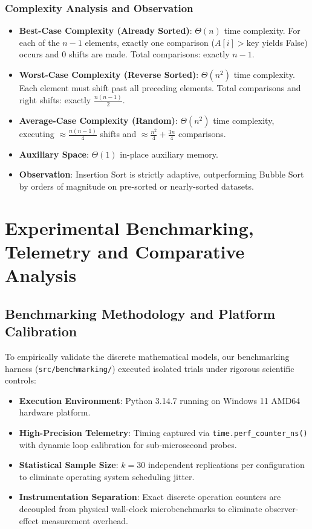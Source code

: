 \documentclass[11pt,a4paper,oneside]{report}
\theoremstyle{definition}
\begin{document}
\subsection{Complexity Analysis and Observation}
\begin{itemize}
    \item \textbf{Best-Case Complexity (Already Sorted)}: $\Theta(n)$ time complexity. For each of the $n-1$ elements, exactly one comparison ($A[i] > \text{key}$ yields False) occurs and 0 shifts are made. Total comparisons: exactly $n - 1$.
    \item \textbf{Worst-Case Complexity (Reverse Sorted)}: $\Theta(n^2)$ time complexity. Each element must shift past all preceding elements. Total comparisons and right shifts: exactly $\frac{n(n-1)}{2}$.
    \item \textbf{Average-Case Complexity (Random)}: $\Theta(n^2)$ time complexity, executing $\approx \frac{n(n-1)}{4}$ shifts and $\approx \frac{n^2}{4} + \frac{3n}{4}$ comparisons.
    \item \textbf{Auxiliary Space}: $\Theta(1)$ in-place auxiliary memory.
    \item \textbf{Observation}: Insertion Sort is strictly adaptive, outperforming Bubble Sort by orders of magnitude on pre-sorted or nearly-sorted datasets.
\end{itemize}

\chapter{Experimental Benchmarking, Telemetry and Comparative Analysis}
\label{chap:experimental_results}

\section{Benchmarking Methodology and Platform Calibration}
To empirically validate the discrete mathematical models, our benchmarking harness (\texttt{src/benchmarking/}) executed isolated trials under rigorous scientific controls:
\begin{itemize}
    \item \textbf{Execution Environment}: Python 3.14.7 running on Windows 11 AMD64 hardware platform.
    \item \textbf{High-Precision Telemetry}: Timing captured via \texttt{time.perf\_counter\_ns()} with dynamic loop calibration for sub-microsecond probes.
    \item \textbf{Statistical Sample Size}: $k = 30$ independent replications per configuration to eliminate operating system scheduling jitter.
    \item \textbf{Instrumentation Separation}: Exact discrete operation counters are decoupled from physical wall-clock microbenchmarks to eliminate observer-effect measurement overhead.
\end{itemize}
\end{document}

